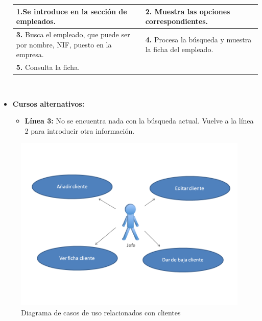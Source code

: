 \documentclass[spanish,a4paper,11pt, twoside]{report}	%
\begin{document}
\begin{itemize}
\begin{tabular}{|p{6cm}||p{6cm}|}
				\textbf{1.}Se introduce en la sección de empleados. & \textbf{2.} Muestra las opciones correspondientes. \\ \hline
				\textbf{3.} Busca el empleado, que puede ser por nombre, NIF, puesto en la
						empresa. & \textbf{4.} Procesa la búsqueda y muestra la ficha del empleado. \\
				\hline \textbf{5.} Consulta la ficha.  & \textbf{} \\ \hline
			\end{tabular}
			\\
			\item \textbf{Cursos alternativos:} 
			\begin{itemize}
			\item  \textbf{Línea 3:} No se encuentra nada con la búsqueda actual. Vuelve a la línea 2 para introducir otra información.
			\end {itemize}
		\end{itemize}

	\begin{figure}[!h]
		\centering
		\includegraphics[scale=0.5]{Cliente.png}
		\caption{Diagrama de casos de uso relacionados con clientes}
	\end{figure}


\end{document}
